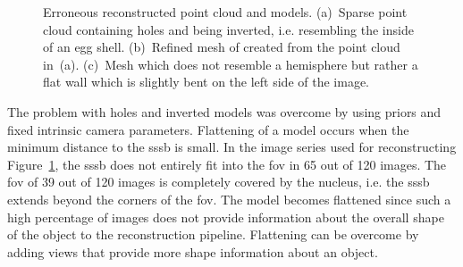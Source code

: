 \begin{figure}[htb]
\begin{subfigure}[b]{0.32\textwidth}
            \caption{}
            \label{fig:model_flat}
        \end{subfigure}
    \caption{Erroneous reconstructed point cloud and models. (a)~Sparse point cloud containing holes and being inverted, i.e. resembling the inside of an egg shell. (b)~Refined mesh of created from the point cloud in~(a). (c)~Mesh which does not resemble a hemisphere but rather a flat wall which is slightly bent on the left side of the image.}
    \label{fig:models_broken}
\end{figure}
The problem with holes and inverted models was overcome by using priors and fixed intrinsic camera parameters. Flattening of a model occurs when the minimum distance to the \gls{sssb} is small. In the image series used for reconstructing Figure~\ref{fig:model_flat}, the \gls{sssb} does not entirely fit into the \gls{fov} in \SI{65}{} out of \SI{120}{} images. The \gls{fov} of \SI{39}{} out of \SI{120}{} images is completely covered by the nucleus, i.e. the \gls{sssb} extends beyond the corners of the \gls{fov}. The model becomes flattened since such a high percentage of images does not provide information about the overall shape of the object to the reconstruction pipeline. Flattening can be overcome by adding views that provide more shape information about an object.

